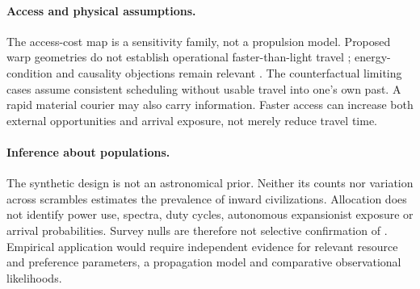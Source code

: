 \paragraph{Access and physical assumptions.}
The access-cost map is a sensitivity family, not a propulsion model.
Proposed warp geometries do not establish operational faster-than-light
travel \citep{Alcubierre1994}; energy-condition and causality objections
remain relevant \citep{Everett1996,Santiago2022}. The counterfactual
limiting cases assume consistent scheduling without usable travel into
one's own past. A rapid material courier may also carry information.
Faster access can increase both external opportunities and arrival
exposure, not merely reduce travel time.

\paragraph{Inference about populations.}
The synthetic design is not an astronomical prior. Neither its counts nor
variation across scrambles estimates the prevalence of inward civilizations.
Allocation does not identify power use, spectra, duty cycles, autonomous
expansionist exposure or arrival probabilities. Survey nulls are therefore
not selective confirmation of \CITH. Empirical application would require
independent evidence for relevant resource and preference parameters,
a propagation model and comparative observational likelihoods.

